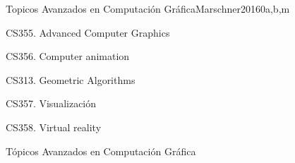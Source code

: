 \begin{syllabus}
\begin{unit}{Topicos Avanzados en Computación Gráfica}{}{Marschner2016}{0}{a,b,m}
   \begin{topics}
      \item CS355. Advanced Computer Graphics
      \item CS356. Computer animation
      \item CS313. Geometric Algorithms
      \item CS357. Visualización
      \item CS358. Virtual reality
   \end{topics}

   \begin{learningoutcomes}
      \item Tópicos Avanzados en Computación Gráfica
   \end{learningoutcomes}
\end{unit}

\begin{coursebibliography}
\end{coursebibliography}

\end{syllabus}
